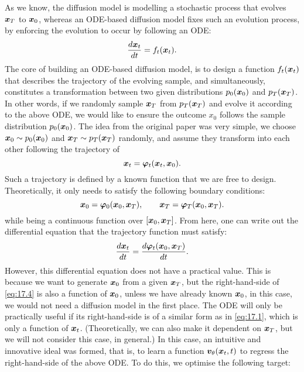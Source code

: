 As we know, the diffusion model is modelling a stochastic process that evolves $\bm{x}_T$ to $\bm{x}_0$, whereas an ODE-based diffusion model fixes such an evolution process, by enforcing the evolution to occur by following an ODE:
\begin{equation}
    \label{eq:17.1}
    \frac{d\bm{x}_{t}}{dt}=f_t(\bm{x}_{t}).
\end{equation}
The core of building an ODE-based diffusion model, is to design a function $f_t(\bm{x}_{t})$ that describes the trajectory of the evolving sample, and simultaneously, constitutes a transformation between two given distributions $p_0 (\bm{x}_0)$ and $p_T (\bm{x}_T)$. In other words, if we randomly sample $\bm{x}_T$ from $p_T (\bm{x}_T)$ and evolve it according to the above ODE, we would like to ensure the outcome $x_0$ follows the sample distribution $p_0 (\bm{x}_0)$. The idea from the original paper was very simple, we choose $\bm{x}_0\sim p_0(\bm{x}_0)$ and $\bm{x}_T\sim p_T(\bm{x}_T)$ randomly, and assume they transform into each other following the trajectory of 
\begin{equation}
    \label{eq:17.2}
    \bm{x}_{t}=\bm{\varphi}_t(\bm{x}_t,\bm{x}_0).
\end{equation}
Such a trajectory is defined by a known function that we are free to design. Theoretically, it only needs to satisfy the following boundary conditions:
\begin{equation}
    \label{eq:17.3}
    \bm{x}_0=\bm{\varphi}_0(\bm{x}_0,\bm{x}_T),\qquad \bm{x}_T=\bm{\varphi}_T(\bm{x}_0,\bm{x}_T).
\end{equation}
while being a continuous function over $[\bm{x}_0,\bm{x}_T]$. From here, one can write out the differential equation that the trajectory function must satisfy:
\begin{equation}
    \label{eq:17.4}
    \frac{d\bm{x}_{t}}{dt}=\frac{d\bm{\varphi}_{t}(\bm{x}_0,\bm{x}_T)}{dt}.
\end{equation}
However, this differential equation does not have a practical value. This is because we want to generate $\bm{x}_0$ from a given $\bm{x}_T$, but the right-hand-side of \cref{eq:17.4} is also a function of $\bm{x}_0$, unless we have already known $\bm{x}_0$, in this case, we would not need a diffusion model in the first place. The ODE will only be practically useful if its right-hand-side is of a similar form as in \cref{eq:17.1}, which is only a function of $\bm{x}_{t}$. (Theoretically, we can also make it dependent on $\bm{x}_T$, but we will not consider this case, in general.) In this case, an intuitive and innovative ideal was formed, that is, to learn a function $\bm{v}_\theta (\bm{x}_{t},t)$ to regress the right-hand-side of the above ODE. To do this, we optimise the following target:
